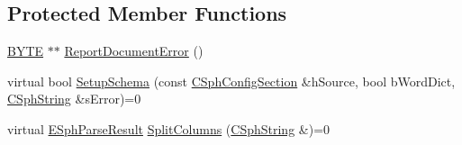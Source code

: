 \subsection*{Protected Member Functions}
\begin{DoxyCompactItemize}
\item 
\hyperlink{sphinxstd_8h_a4ae1dab0fb4b072a66584546209e7d58}{B\-Y\-T\-E} $\ast$$\ast$ \hyperlink{classCSphSource__BaseSV_a197492bc1d340e835200e5f4a928da34}{Report\-Document\-Error} ()
\item 
virtual bool \hyperlink{classCSphSource__BaseSV_a8180e78e4e113f412439b1aa1a8d42c1}{Setup\-Schema} (const \hyperlink{classCSphConfigSection}{C\-Sph\-Config\-Section} \&h\-Source, bool b\-Word\-Dict, \hyperlink{structCSphString}{C\-Sph\-String} \&s\-Error)=0
\item 
virtual \hyperlink{classCSphSource__BaseSV_aa78147110220c575814ba85191261524}{E\-Sph\-Parse\-Result} \hyperlink{classCSphSource__BaseSV_a2a84bb3d23903c8f483c0c02c6d321f4}{Split\-Columns} (\hyperlink{structCSphString}{C\-Sph\-String} \&)=0
\end{DoxyCompactItemize}
